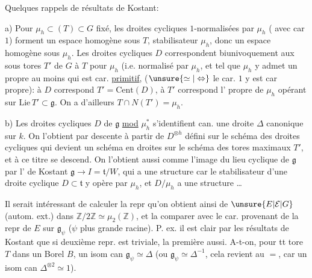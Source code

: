 Quelques rappels de résultats de Kostant:

a) Pour $\mu_h\subset(T)\subset G$ fixé, les droites cycliques  $1$-normalisées par $\mu_h$ ( avec car $1$) forment un espace homogène sous $T$, stabilisateur $\mu_h$, donc un espace homogène sous $\mu_h$.
Les droites cycliques $D$ correspondent biunivoquement aux sous tores $T'$ de $G$   à $T$ pour $\mu_h$ (i.e. normalisé par $\mu_h$, et tel que $\mu_h$ y admet un  propre au moins qui est  car. \uline{primitif}, ($\unsure{\simeq|\Leftrightarrow}$ le car. $1$ y est car propre): à $D$ correspond $T'=\mathrm{Cent}(D)$, à $T'$ correspond l' propre de $\mu_h$ opérant sur  $\mathrm{Lie}\,T'\subset\mathfrak g$. On a d'ailleurs $T\cap N(T')=\mu_h$.

b) Les droites cycliques $D$ de $\mathfrak g$ \uline{mod} $\mu_h^*$ s'identifient can.  une droite $\Delta$ canonique sur $k$. On l'obtient par descente à partir de $D^{\otimes h}$ défini sur le schéma des droites cycliques qui devient un schéma en droites sur le schéma des tores maximaux $T'$, et à ce titre se descend.
On l'obtient aussi comme l'image du lieu cyclique de $\mathfrak g$ par l' de Kostant $\mathfrak g\longrightarrow I=\mathfrak t/W$, qui a une structure   car le stabilisateur  d'une droite cyclique $D\subset\mathfrak t$ y opère par $\mu_h$, et $D/\mu_h$ a une structure  \ldots

Il serait intéressant de calculer  la repr qu'on obtient ainsi de $\unsure{E|\mathcal E|G}$ (autom. ext.) dans $\mathbb Z/2\mathbb Z\simeq\mu_2(\mathbb Z)$, et la comparer avec le car. provenant de la repr de $E$ sur $\mathfrak g_\psi$ ($\psi$ plus grande racine). P. ex. il est clair par les résultats de Kostant que si  deuxième repr. est triviale, la première aussi.
A-t-on, pour tt tore $T$ dans un Borel $B$, un isom can $\mathfrak g_\psi\simeq\Delta$ (ou $\mathfrak g_\psi\simeq\Delta^{-1}$,  cela revient au $=$, car  un isom can $\Delta^{\otimes2}\simeq 1$).
